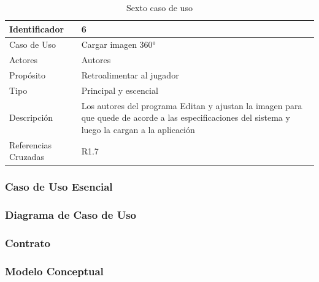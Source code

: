 \begin{table}[H]
    \begin{center}
        \begin{tabular}{| l | m{12cm} |}        
        	\hline 
        	Identificador & 6\\
        	\hline
        	Caso de Uso & Cargar imagen 360°\\
        	\hline
        	Actores & Autores\\
        	\hline
        	Propósito & Retroalimentar al jugador\\
        	\hline
        	Tipo & Principal y escencial\\
        	\hline
        	Descripción & Los autores del programa Editan y ajustan la imagen para que quede de acorde a las especificaciones del sistema y luego la cargan a la aplicación\\
        	\hline
        	Referencias Cruzadas & R1.7\\
        	\hline
        \end{tabular}
    \caption{Sexto caso de uso}
    \end{center}
\end{table}
\subsubsection{Caso de Uso Esencial}

\subsubsection{Diagrama de Caso de Uso}
\subsubsection{Contrato}
\subsubsection{Modelo Conceptual}
